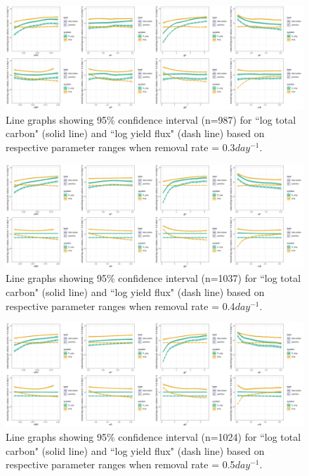 \documentclass[../thesis.tex]{subfiles} %
\begin{document}
\begin{figure}[H]
    \centering
    \includegraphics[width=\linewidth]{../result/var_03.png}
    \caption[95\% distribution for $x=0.3day^{-1}$]{Line graphs showing 95\% confidence interval (n=987) for ``log total carbon" (solid line) and ``log yield flux" (dash line) based on respective parameter ranges when removal rate = 0.3$day^{-1}$.}
    \label{fig:v03}
\end{figure}

\begin{figure}[H]
    \centering
    \includegraphics[width=\linewidth]{../result/var_04.png}
    \caption[95\% distribution for $x=0.4day^{-1}$]{Line graphs showing 95\% confidence interval (n=1037) for ``log total carbon" (solid line) and ``log yield flux" (dash line) based on respective parameter ranges when removal rate = 0.4$day^{-1}$.}
    \label{fig:v04}
\end{figure}

\begin{figure}[H]
    \centering
    \includegraphics[width=\linewidth]{../result/var_05.png}
    \caption[95\% distribution for $x=0.5day^{-1}$]{Line graphs showing 95\% confidence interval (n=1024) for ``log total carbon" (solid line) and ``log yield flux" (dash line) based on respective parameter ranges when removal rate = 0.5$day^{-1}$.}
    \label{fig:v05}
\end{figure}
\end{document}
